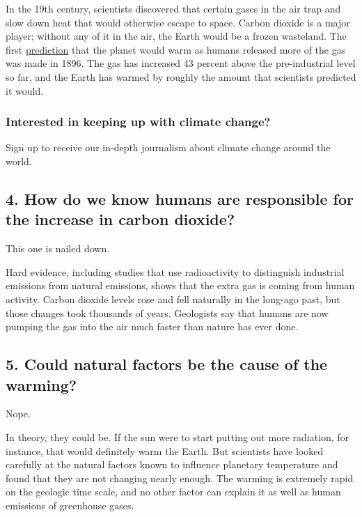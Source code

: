 In the 19th century, scientists discovered that certain gases in the air
trap and slow down heat that would otherwise escape to space. Carbon
dioxide is a major player; without any of it in the air, the Earth would
be a frozen wasteland. The first
\href{http://www.rsc.org/images/Arrhenius1896_tcm18-173546.pdf}{prediction}
that the planet would warm as humans released more of the gas was made
in 1896. The gas has increased 43 percent above the pre-industrial level
so far, and the Earth has warmed by roughly the amount that scientists
predicted it would.

\hypertarget{interested-in-keeping-up-with-climate-change}{%
\subsubsection{Interested in keeping up with climate
change?}\label{interested-in-keeping-up-with-climate-change}}

Sign up to receive our in-depth journalism about climate change around
the world.

\hypertarget{4-how-do-we-know-humans-are-responsible-for-the-increase-in-carbon-dioxide}{%
\subsection{4. How do we know humans are responsible for the increase in
carbon
dioxide?}\label{4-how-do-we-know-humans-are-responsible-for-the-increase-in-carbon-dioxide}}

This one is nailed down.

Hard evidence, including studies that use radioactivity to distinguish
industrial emissions from natural emissions, shows that the extra gas is
coming from human activity. Carbon dioxide levels rose and fell
naturally in the long-ago past, but those changes took thousands of
years. Geologists say that humans are now pumping the gas into the air
much faster than nature has ever done.

\hypertarget{5-could-natural-factors-be-the-cause-of-the-warming}{%
\subsection{5. Could natural factors be the cause of the
warming?}\label{5-could-natural-factors-be-the-cause-of-the-warming}}

Nope.

In theory, they could be. If the sun were to start putting out more
radiation, for instance, that would definitely warm the Earth. But
scientists have looked carefully at the natural factors known to
influence planetary temperature and found that they are not changing
nearly enough. The warming is extremely rapid on the geologic time
scale, and no other factor can explain it as well as human emissions of
greenhouse gases.

